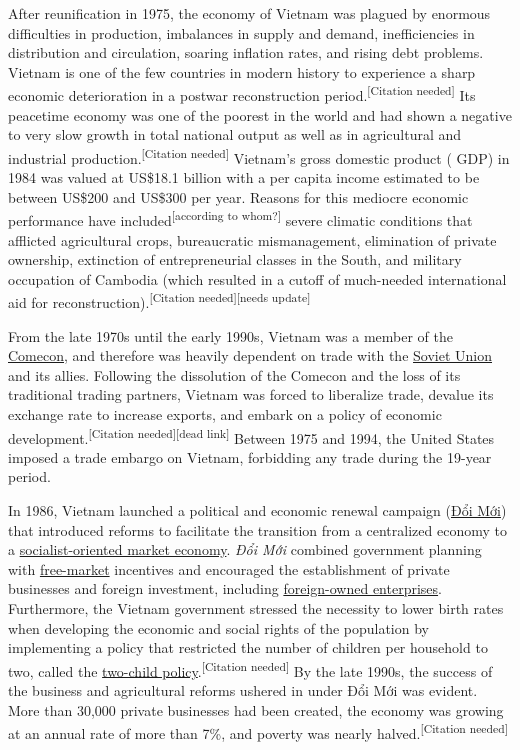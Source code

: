 \documentclass{article}
\begin{document}
After reunification in 1975, the economy of Vietnam was plagued by enormous difficulties in production, imbalances in supply and demand, inefficiencies in distribution and circulation, soaring inflation rates, and rising debt problems. Vietnam is one of the few countries in modern history to experience a sharp economic deterioration in a postwar reconstruction period.\textsuperscript{[Citation needed]} Its peacetime economy was one of the poorest in the world and had shown a negative to very slow growth in total national output as well as in agricultural and industrial production.\textsuperscript{[Citation needed]} Vietnam's gross domestic product ( GDP) in 1984 was valued at US\$18.1 billion with a per capita income estimated to be between US\$200 and US\$300 per year. Reasons for this mediocre economic performance have included\textsuperscript{[according to whom?]} severe climatic conditions that afflicted agricultural crops, bureaucratic mismanagement, elimination of private ownership, extinction of entrepreneurial classes in the South, and military occupation of Cambodia (which resulted in a cutoff of much-needed international aid for reconstruction).\textsuperscript{[Citation needed][needs update]}

From the late 1970s until the early 1990s, Vietnam was a member of the \href{https://en.wikipedia.org/wiki/Comecon}{Comecon}, and therefore was heavily dependent on trade with the \href{https://en.wikipedia.org/wiki/Soviet_Union}{Soviet Union} and its allies. Following the dissolution of the Comecon and the loss of its traditional trading partners, Vietnam was forced to liberalize trade, devalue its exchange rate to increase exports, and embark on a policy of economic development.\textsuperscript{[Citation needed][dead link]}  Between 1975 and 1994, the United States imposed a trade embargo on Vietnam, forbidding any trade during the 19-year period.

In 1986, Vietnam launched a political and economic renewal campaign (\href{https://en.wikipedia.org/wiki/%C4%90%E1%BB%95i_M%E1%BB%9Bi}{Đổi Mới}) that introduced reforms to facilitate the transition from a centralized economy to a \href{https://en.wikipedia.org/wiki/Socialist-oriented_market_economy}{socialist-oriented market economy}. \textit{Đổi Mới} combined government planning with \href{https://en.wikipedia.org/wiki/Free-market}{free-market} incentives and encouraged the establishment of private businesses and foreign investment, including \href{https://en.wikipedia.org/wiki/Foreign_direct_investment}{foreign-owned enterprises}. Furthermore, the Vietnam government stressed the necessity to lower birth rates when developing the economic and social rights of the population by implementing a policy that restricted the number of children per household to two, called the \href{https://en.wikipedia.org/wiki/Two-child_policy}{two-child policy}.\textsuperscript{[Citation needed]} By the late 1990s, the success of the business and agricultural reforms ushered in under Đổi Mới was evident. More than 30,000 private businesses had been created, the economy was growing at an annual rate of more than 7\%, and poverty was nearly halved.\textsuperscript{[Citation needed]}
\end{document}
